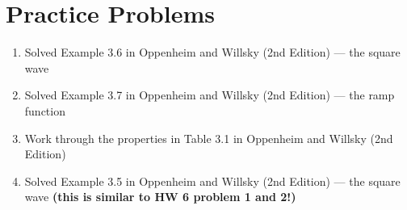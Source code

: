 \documentclass{ee102_notes}
\begin{document}
\section{Practice Problems}
\begin{enumerate}
    \item Solved Example 3.6 in Oppenheim and Willsky (2nd Edition) --- the square wave
    \item Solved Example 3.7 in Oppenheim and Willsky (2nd Edition) --- the ramp function
    \item Work through the properties in Table 3.1 in Oppenheim and Willsky (2nd Edition)
    \item Solved Example 3.5 in Oppenheim and Willsky (2nd Edition) --- the square wave \textbf{(this is similar to HW 6 problem 1 and 2!)}
\end{enumerate}
\end{document}
